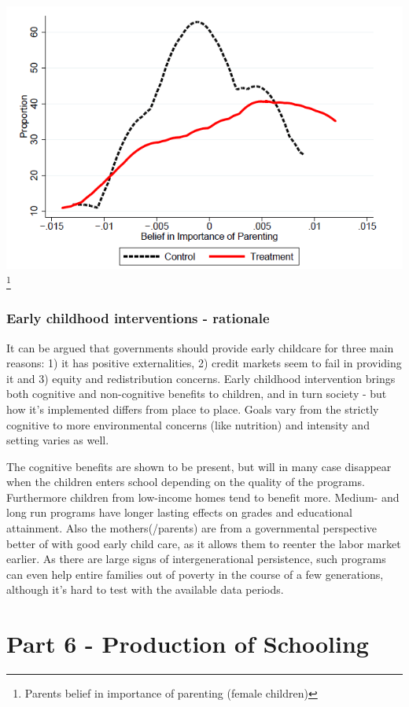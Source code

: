 \documentclass[12pt, a4paper]{article}
\begin{document}
\begin{multicols}{2}
\includegraphics[width = 0.5 \textwidth]{perry1.PNG}\footnote{Parents belief in importance of parenting (female children)}

\subsubsection{Early childhood interventions - rationale}
It can be argued that governments should provide early childcare for three main reasons: 1) it has positive externalities, 2) credit markets seem to fail in providing it and 3) equity and redistribution concerns. Early childhood intervention brings both cognitive and non-cognitive benefits to children, and in turn society - but how it's implemented differs from place to place. Goals vary from the strictly cognitive to more environmental concerns (like nutrition) and intensity and setting varies as well. 

The cognitive benefits are shown to be present, but will in many case disappear when the children enters school depending on the quality of the programs. Furthermore children from low-income homes tend to benefit more. Medium- and long run programs have longer lasting effects on grades and educational attainment. Also the mothers(/parents) are from a governmental perspective better of with good early child care, as it allows them to reenter the labor market earlier. As there are large signs of intergenerational persistence, such programs can even help entire families out of poverty in the course of a few generations, although it's hard to test with the available data periods.

\section{Part 6 - Production of Schooling}

\end{multicols}
\end{document}
